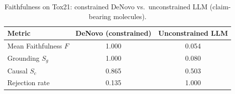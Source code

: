 \begin{table}[h]
\centering
\caption{Faithfulness on Tox21: constrained DeNovo vs.\ unconstrained LLM (claim-bearing molecules).}
\label{tab:faith_compare}
\begin{tabular}{lcc}
\toprule
\textbf{Metric} & \textbf{DeNovo (constrained)} & \textbf{Unconstrained LLM} \\
\midrule
Mean Faithfulness $F$ & 1.000 & 0.054 \\
Grounding $S_g$ & 1.000 & 0.080 \\
Causal $S_c$ & 0.865 & 0.503 \\
Rejection rate & 0.135 & 1.000 \\
\bottomrule
\end{tabular}
\end{table}
